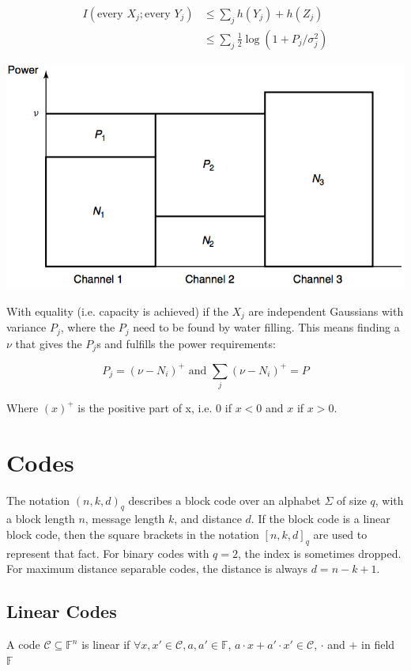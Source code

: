 \documentclass[10pt,a4paper,landscape]{article}
\begin{document}
\begin{multicols*}{4}
\begin{align*}
	I(\text{every } X_j; \text{every } Y_j) 
	&\leq \sum_j h(Y_j) + h(Z_j)\\ 
	&\leq \sum_j \frac{1}{2} \log(1 + P_j/\sigma^2_j)
\end{align*}

\begin{colfig}
	\centering
	\includegraphics[width=\linewidth]{water-filling.png}
\end{colfig}

With equality (i.e. capacity is achieved) if the $X_j$ are independent Gaussians with variance $P_j$, where the $P_j$ need to be found by water filling. This means finding a $\nu$ that gives the $P_j$s and fulfills the power requirements:

$$P_j = (\nu - N_i)^+ \text{ and } \sum_j (\nu - N_i)^+ = P$$

Where $(x)^+$ is the positive part of x, i.e. 0 if $x < 0$ and $x$ if $x > 0$.

\section{Codes}
The notation $(n,k,d)_q$ describes a block code over an alphabet $\Sigma$ of size $q$, with a block length $n$, message length $k$, and distance $d$.
If the block code is a linear block code, then the square brackets in the notation $[n,k,d]_q$ are used to represent that fact.
For binary codes with $q=2$, the index is sometimes dropped.
For maximum distance separable codes, the distance is always $d=n-k+1$.

\subsection{Linear Codes}
A code $\mathcal{C} \subseteq \mathbb{F}^n$ is linear if $\forall x,x' \in \mathcal{C}, a,a' \in \mathbb{F}$, $a \cdot x + a' \cdot x' \in \mathcal{C}$, $\cdot$ and $+$ in field $\mathbb{F}$


\end{multicols*}
\end{document}
